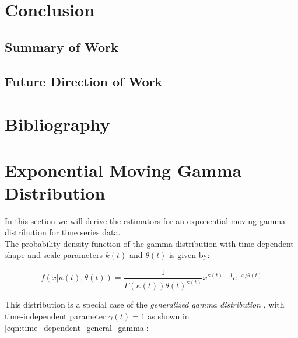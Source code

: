 \documentclass[12pt]{article}
\begin{document}
\section{Conclusion}

\subsection{Summary of Work}

\subsection{Future Direction of Work}

\pagebreak

\section{Bibliography}


\pagebreak


\appendix

\section{Exponential Moving Gamma Distribution}
In this section we will derive the estimators for an exponential moving gamma distribution for time series data.\\


The probability density function of the gamma distribution with time-dependent shape and scale parameters $k(t)$ and $\theta(t)$ is given by:

\begin{equation}
f(x|\kappa(t), \theta(t)) = \frac{1}{\Gamma(\kappa(t))\theta(t)^{\kappa(t)}} x^{\kappa(t)-1}e^{-x/\theta(t)}
\label{eqn:time_dependent_gamma}
\end{equation}

\noindent This distribution is a special case of the \textit{generalized gamma distribution} \label{eqn:time_dependent_general_gamma}, with time-independent parameter $\gamma(t) = 1$ as shown in \eqref{eqn:time_dependent_general_gamma}:
\end{document}
